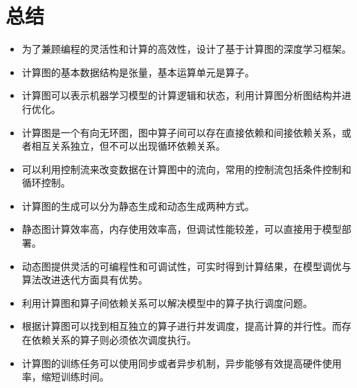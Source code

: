 \documentclass[letterpaper,10pt,english]{sphinxmanual}
\begin{document}
\section{总结}
\label{\detokenize{chapter_computational_graph/summary:id1}}\label{\detokenize{chapter_computational_graph/summary::doc}}\begin{itemize}
\item {} 
\sphinxAtStartPar
为了兼顾编程的灵活性和计算的高效性，设计了基于计算图的深度学习框架。

\item {} 
\sphinxAtStartPar
计算图的基本数据结构是张量，基本运算单元是算子。

\item {} 
\sphinxAtStartPar
计算图可以表示机器学习模型的计算逻辑和状态，利用计算图分析图结构并进行优化。

\item {} 
\sphinxAtStartPar
计算图是一个有向无环图，图中算子间可以存在直接依赖和间接依赖关系，或者相互关系独立，但不可以出现循环依赖关系。

\item {} 
\sphinxAtStartPar
可以利用控制流来改变数据在计算图中的流向，常用的控制流包括条件控制和循环控制。

\item {} 
\sphinxAtStartPar
计算图的生成可以分为静态生成和动态生成两种方式。

\item {} 
\sphinxAtStartPar
静态图计算效率高，内存使用效率高，但调试性能较差，可以直接用于模型部署。

\item {} 
\sphinxAtStartPar
动态图提供灵活的可编程性和可调试性，可实时得到计算结果，在模型调优与算法改进迭代方面具有优势。

\item {} 
\sphinxAtStartPar
利用计算图和算子间依赖关系可以解决模型中的算子执行调度问题。

\item {} 
\sphinxAtStartPar
根据计算图可以找到相互独立的算子进行并发调度，提高计算的并行性。而存在依赖关系的算子则必须依次调度执行。

\item {} 
\sphinxAtStartPar
计算图的训练任务可以使用同步或者异步机制，异步能够有效提高硬件使用率，缩短训练时间。

\end{itemize}
\end{document}

